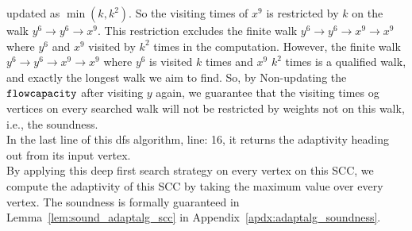   updated as $\min(k, k^2)$.
  So
  the visiting times of $x^9$ is restricted by $k$ on the walk $y^6 \to y^6 \to x^9$.
  This restriction excludes the finite walk $y^6 \to y^6 \to x^9 \to x^9$ where $y^6$ and $x^9$ visited by $k^2$ times
  in the computation. 
  However, the finite walk $y^6 \to y^6 \to x^9 \to x^9$ where $y^6$ is visited $k$ times and $x^9$ $k^2$ times is 
  a qualified walk, and exactly the longest walk we aim to find. So, by Non-updating the $\mathtt{flowcapacity}$ after 
  visiting $y$ again, we guarantee that the visiting times og vertices on every searched walk will not be restricted by weights not on this walk,
  i.e., the soundness.
 \\
In the last line of this dfs algorithm, line: 16, it returns the adaptivity heading out from its input vertex.
\\
By applying this deep first search strategy on every vertex on this SCC, 
we compute the adaptivity of this SCC by taking the maximum 
value over every vertex.
%
The soundness is formally guaranteed in Lemma~\ref{lem:sound_adaptalg_scc} in Appendix~\ref{apdx:adaptalg_soundness}.
